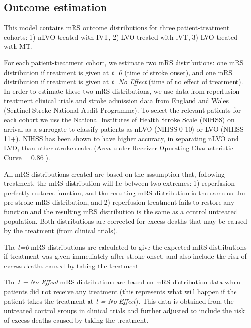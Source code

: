 \subsection{Outcome estimation}

This model contains mRS outcome distributions for three patient-treatment cohorts: 1) nLVO treated with IVT, 2) LVO treated with IVT, 3) LVO treated with MT.

For each patient-treatment cohort, we estimate two mRS distributions: one mRS distribution if treatment is given at \emph{t=0} (time of stroke onset), and one mRS distribution if treatment is given at \emph{t=No Effect} (time of no effect of treatment). In order to estimate these two mRS distributions, we use data from reperfusion treatment clinical trials \cite{lees_time_2010, emberson_effect_2014, goyal_endovascular_2016, fransen_time_2016} and stroke admission data from England and Wales (Sentinel Stroke National Audit Programme). To select the relevant patients for each cohort we use the National Institutes of Health Stroke Scale (NIHSS) on arrival as a surrogate to classify patients as nLVO (NIHSS 0-10) or LVO (NIHSS 11+). NIHSS has been shown to have higher accuracy, in separating nLVO and LVO, than other stroke scales (Area under Receiver Operating Characteristic Curve = 0.86 \cite{duvekot_comparison_2021}).


All mRS distributions created are based on the assumption that, following treatment, the mRS distribution will lie between two extremes: 1) reperfusion perfectly restores function, and the resulting mRS distribution is the same as the pre-stroke mRS distribution, and 2) reperfusion treatment fails to restore any function and the resulting mRS distribution is the same as a control untreated population. Both distributions are corrected for excess deaths that may be caused by the treatment (from clinical trials). 

The \textit{t=0} mRS distributions are calculated to give the expected mRS distributions if treatment was given immediately after stroke onset, and also include the risk of excess deaths caused by taking the treatment. 

The \textit{t = No Effect} mRS distributions are based on mRS distribution data when patients did not receive any treatment (this represents what will happen if the patient takes the treatment at \textit{t = No Effect}). This data is obtained from the untreated control groups in clinical trials and further adjusted to include the risk of excess deaths caused by taking the treatment.


